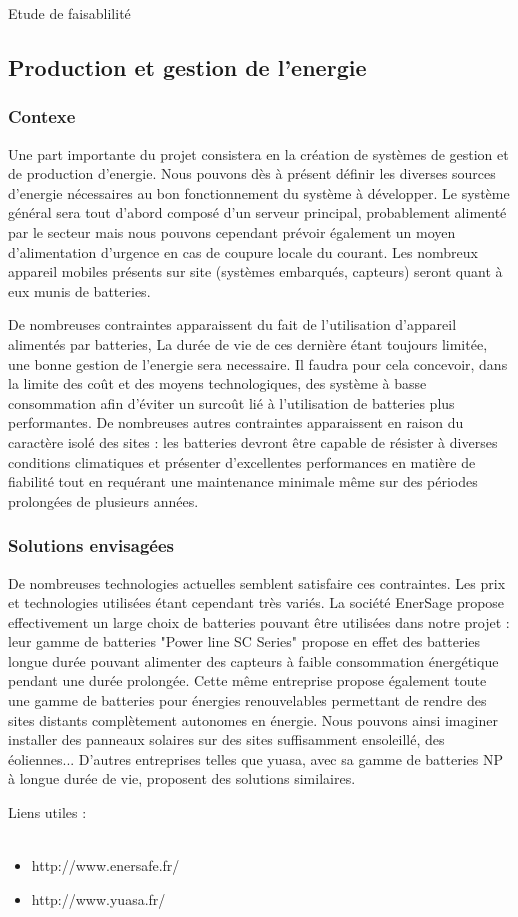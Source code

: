 Etude de faisablilité

\subsection {Production et gestion de l'energie}
	\subsubsection {Contexe}
Une part importante du projet consistera en la création de systèmes de gestion et de production d'energie.
Nous pouvons dès à présent définir les diverses sources d'energie nécessaires au bon fonctionnement du système à développer.
Le système général sera tout d'abord composé d'un serveur principal, probablement alimenté par le secteur mais nous pouvons cependant prévoir également un moyen d'alimentation d'urgence en cas de coupure locale du courant.
Les nombreux appareil mobiles présents sur site (systèmes embarqués, capteurs) seront quant à eux munis de batteries.

De nombreuses contraintes apparaissent du fait de l'utilisation d'appareil alimentés par batteries, La durée de vie de ces dernière étant toujours limitée, une bonne gestion de l'energie sera necessaire. Il faudra pour cela concevoir, dans la limite des coût et des moyens technologiques, des système à basse consommation afin d'éviter un surcoût lié à l'utilisation de batteries plus performantes. De nombreuses autres contraintes apparaissent en raison du caractère isolé des sites : les batteries devront être capable de résister à diverses conditions climatiques et présenter d'excellentes performances en matière de fiabilité tout en requérant une maintenance minimale même sur des périodes prolongées de plusieurs années.


	\subsubsection {Solutions envisagées}
De nombreuses technologies actuelles semblent satisfaire ces contraintes. Les prix et technologies utilisées étant cependant très variés.
La société EnerSage propose effectivement un large choix de batteries pouvant être utilisées dans notre projet : leur gamme de batteries "Power line SC Series" propose en effet des batteries longue durée pouvant alimenter des capteurs à faible consommation énergétique pendant une durée prolongée. Cette même entreprise propose également toute une gamme de batteries pour énergies renouvelables permettant de rendre des sites distants complètement autonomes en énergie. Nous pouvons ainsi imaginer installer des panneaux solaires sur des sites suffisamment ensoleillé, des éoliennes...
D'autres entreprises telles que yuasa, avec sa gamme de batteries NP à longue durée de vie, proposent des solutions similaires.

Liens utiles : \\~
\begin {itemize}
	\item http://www.enersafe.fr/
	\item http://www.yuasa.fr/
\end {itemize}

